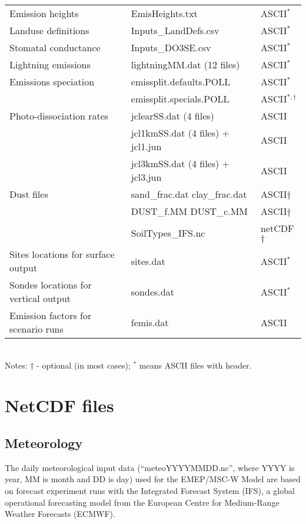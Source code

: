 \begin{table}
\begin{center}
\begin{small}
\begin{tabular}{lll}
Emission heights & EmisHeights.txt & ASCII$^*$\\
Landuse definitions & Inputs\_LandDefs.csv & ASCII$^*$\\
Stomatal conductance & Inputs\_DO3SE.csv & ASCII$^*$\\
Lightning emissions & lightningMM.dat  \quad (12 files) & ASCII$^*$\\
Emissions speciation & emissplit.defaults.POLL & ASCII$^*$\\
                     & emissplit.specials.POLL & ASCII$^{*,\dagger}$\\
Photo-dissociation rates & jclearSS.dat \quad (4 files) & ASCII\\
 & jcl1kmSS.dat \quad (4 files) + jcl1.jun & ASCII\\
 & jcl3kmSS.dat \quad (4 files) + jcl3.jun & ASCII\\
Dust files & sand\_frac.dat clay\_frac.dat & ASCII$\dagger$\\
 & DUST\_f.MM DUST\_c.MM & ASCII$\dagger$\\
 & SoilTypes\_IFS.nc & netCDF$\dagger$\\
Sites locations for surface output & sites.dat & ASCII$^*$\\
Sondes locations for vertical output & sondes.dat & ASCII$^*$\\
Emission factors for scenario runs & femis.dat & ASCII\\
\hline
\end{tabular}\\
Notes: $\dagger$ - optional (in most cases); 
$^*$ means ASCII files with header.
\end{small}
\end{center}

\end{table}

\newpage
\section{NetCDF files}



\subsection{Meteorology}
The daily meteorological input data (``meteoYYYYMMDD.nc'', where YYYY is year, MM is month 
and DD is day) used for the EMEP/MSC-W Model are based on
forecast experiment runs with the Integrated Forecast System (IFS), a global
operational forecasting model from the European Centre for Medium-Range
Weather Forecasts (ECMWF).

